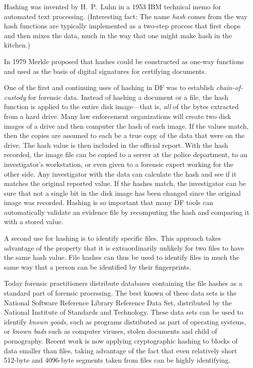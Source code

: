 \documentclass[11pt,letter]{article}
\begin{document}
Hashing was invented by H.\ P.\ Luhn in a 1953 IBM technical memo for
automated text processing. (Interesting fact: The name \emph{hash}
comes from the way hash functions are typically implemented as a
two-step process that first chops and then mixes the data, much in the
way that one might make hash in the kitchen.)

In 1979 Merkle proposed that hashes could be constructed as one-way
functions and used as the basis of digital signatures for certifying
documents\citep{merkle:79}.

One of the first and continuing uses of hashing in DF was to establish
\emph{chain-of-custody} for forensic data. Instead of hashing a
document or a file, the hash function is applied to the entire disk
image---that is, \emph{all} of the bytes extracted from a hard
drive. Many law enforcement organizations will create two disk images
of a drive and then computer the hash of each image.  If the values
match, then the copies are assumed to each be a true copy of the data
that were on the drive. The hash value is then included in the
official report. With the hash recorded, the image file can be copied
to a server at the police department, to an investigator's
workstation, or even given to a forensic expert working for the other
side. Any investigator with the data can calculate the hash and see if
it matches the original reported value. If the hashes match, the
investigator can be sure that not a single bit in the disk image has
been changed since the original image was recorded. Hashing is so
important that many DF tools can automatically validate an evidence
file by recomputing the hash and comparing it with a stored value.

A second use for hashing is to identify specific
files. This approach takes advantage of the property that it is
extraordinarily unlikely for two files to have the same
hash value. File hashes can thus be used to identify files in much the
same way that a person can be identified by their fingerprints. 

Today forensic practitioners distribute databases containing the file
hashes as a standard part of forensic processing. The best known of these data
sets is the National Software Reference Library Reference Data Set,
distributed by the National Institute of Standards and
Technology\cite{nist-nsrl-rds-march2012}. These data sets can be used
to identify \emph{known goods}, such as programs distributed as part
of operating systems, or \emph{known bads} such as computer viruses,
stolen documents and child of pornography. Recent work is now
applying cryptographic hashing to blocks of data smaller than
files\cite{garfinkel:sector-id}, taking advantage of the fact that
even relatively short 512-byte and 4096-byte segments taken from
files can be highly identifying. 
\end{document}
